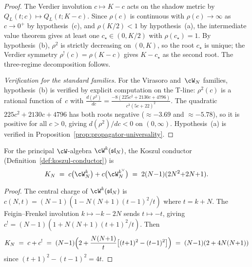 \begin{proof}
The Verdier involution $c \mapsto K - c$ acts on the shadow
metric by $Q_L(t; c) \mapsto Q_L(t; K{-}c)$.
Since $\rho(c)$ is continuous with $\rho(c) \to \infty$ as
$c \to 0^+$ by hypothesis~(c),
and $\rho(K/2) < 1$ by hypothesis~(a), the intermediate value
theorem gives at least one $c_\star \in (0, K/2)$ with
$\rho(c_\star) = 1$.
By hypothesis~(b), $\rho^2$ is strictly decreasing on
$(0, K)$, so the root $c_\star$ is unique; the Verdier
symmetry $\rho^!(c) = \rho(K{-}c)$ gives
$K - c_\star$ as the second root.
The three-regime decomposition follows.

\emph{Verification for the standard families.}
For the Virasoro and~$\cW_N$ families, hypothesis~(b)
is verified by explicit computation on the T-line:
$\rho^2(c)$ is a rational function of~$c$ with
$\frac{d(\rho^2)}{dc}
= \frac{-8(225c^2 + 2130c + 4796)}{c^3(5c{+}22)^2}$.
The quadratic $225c^2 + 2130c + 4796$ has both roots
negative ($\approx -3.69$ and $\approx -5.78$),
so it is positive for all $c > 0$, giving
$d(\rho^2)/dc < 0$ on $(0, \infty)$.
Hypothesis~(a) is verified in
Proposition~\ref{prop:propagator-universality}.
\end{proof}

\begin{proposition}
\label{prop:koszul-conductor-wn}
\ClaimStatusProvedHere
{}
For the principal $\cW$-algebra $\cW^k(\mathfrak{sl}_N)$,
the Koszul conductor
\textup{(}Definition~\textup{\ref{def:koszul-conductor})} is
\begin{equation}\label{eq:koszul-conductor-wn}
  K_N
  \;=\;
  c\bigl(\cW^k_N\bigr) + c\bigl(\cW^{k^\vee}_N\bigr)
  \;=\;
  2(N{-}1)(2N^2{+}2N{+}1).
\end{equation}
\end{proposition}

\begin{proof}
The central charge of $\cW^k(\mathfrak{sl}_N)$ is
$c(N,t) = (N{-}1)(1 - N(N{+}1)(t{-}1)^2/t)$ where
$t = k + N$.  The Feigin--Frenkel involution
$k \mapsto -k - 2N$ sends $t \mapsto -t$, giving
$c^! = (N{-}1)(1 + N(N{+}1)(t{+}1)^2/t)$.
Then
\[
  K_N
  \;=\;
  c + c^!
  \;=\;
  (N{-}1)\Bigl(2 +
  \frac{N(N{+}1)}{t}\bigl[(t{+}1)^2 - (t{-}1)^2\bigr]
  \Bigr)
  \;=\;
  (N{-}1)(2 + 4N(N{+}1))
\]
since $(t{+}1)^2 - (t{-}1)^2 = 4t$.
\end{proof}

